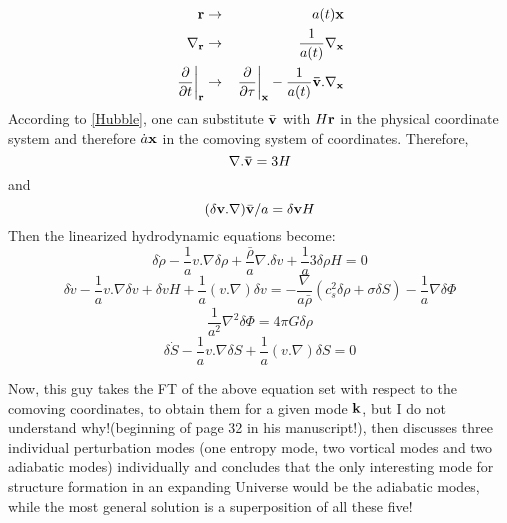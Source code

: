 \documentclass[paper=a4, fontsize=11pt]{scrartcl} %
\numberwithin{equation}{section} %
\numberwithin{figure}{section} %
\numberwithin{table}{section} %
\begin{document}
\begin{eqnarray}
{\bf r} &\rightarrow& a(t) {\bf x}  \nonumber \\
{\bf \nabla_r} &\rightarrow& \frac{1}{a(t)}{\bf \nabla_x} \nonumber \\
\left.\frac{\partial}{\partial t}\right |_{\bf r} &\rightarrow& \left.\frac{\partial}{\partial \tau}\right |_{\bf x} - \frac{1}{a(t)} {\bf \bar{v}}.{\bf \nabla_x} \nonumber
\end{eqnarray}
According to \ref{Hubble}, one can substitute $\bar{\bf v}$ with $H{\bf r}$ in the physical coordinate system and therefore $\dot{a}{\bf x}$ in the comoving system of coordinates. Therefore,
\begin{equation}
{\bf \nabla . \bar{v}} = 3H
\end{equation}
and
\begin{equation}
(\delta{\bf v.\nabla})\bar{\bf v}/a = \delta{\bf v}H 
\end{equation}
Then the linearized hydrodynamic equations become:
\begin{equation}
\label{continuity_1}
\delta\dot{\rho} - \frac{1}{a}v.\nabla \delta\rho + \frac{\bar{\rho}}{a}\nabla . \delta v + \frac{1}{a} 3\delta\rho H = 0
\end{equation}
\begin{equation}
\label{Euler_1}
\delta \dot{v} - \frac{1}{a}v.\nabla \delta v + \delta vH + \frac{1}{a}(v.\nabla)\delta v = - \frac{\nabla}{a\bar{\rho}}(c_s^2\delta\rho + \sigma\delta S) - \frac{1}{a}\nabla \delta\Phi
\end{equation}
\begin{equation}
\label{Poisson_1}
\frac{1}{a^2}\nabla^2\delta\Phi = 4\pi G\delta\rho
\end{equation}
\begin{equation}
\label{entropy_1}
\delta\dot{S} - \frac{1}{a}v.\nabla \delta S + \frac{1}{a} (v.\nabla) \delta S = 0
\end{equation}

Now, this guy takes the FT of the above equation set with respect to the comoving coordinates, to obtain them for a given mode ${\bf k}$, but I do not understand why!(beginning of page 32 in his manuscript!), then discusses three individual perturbation modes (one entropy mode, two vortical modes and two adiabatic modes) individually and concludes that the only interesting mode for structure formation in an expanding Universe would be the adiabatic modes, while the most general solution is a superposition of all these five!
\end{document}
